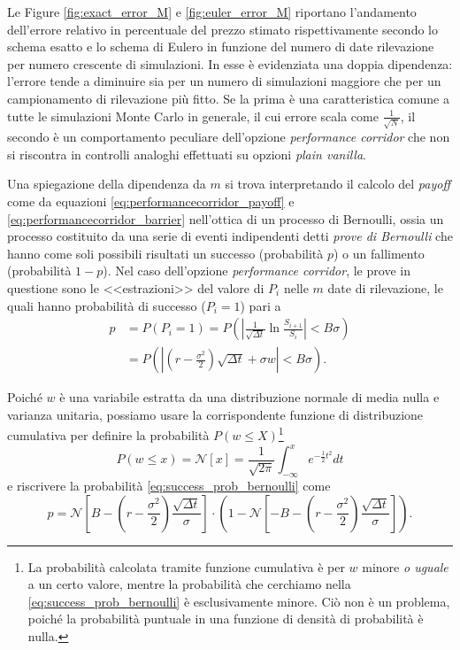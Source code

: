 Le Figure \ref{fig:exact_error_M} e \ref{fig:euler_error_M} riportano l'andamento dell'errore relativo in percentuale del prezzo stimato rispettivamente secondo lo schema esatto e lo schema di Eulero in funzione del numero di date rilevazione per numero crescente di simulazioni. In esse è evidenziata una doppia dipendenza: l'errore tende a diminuire sia per un numero di simulazioni maggiore che per un campionamento di rilevazione più fitto. Se la prima è una caratteristica comune a tutte le simulazioni Monte Carlo in generale, il cui errore scala come $\frac{1}{\sqrt{N}}$, il secondo è un comportamento peculiare dell'opzione \textit{performance corridor} che non si riscontra in controlli analoghi effettuati su opzioni \textit{plain vanilla}.

Una spiegazione della dipendenza da $m$ si trova interpretando il calcolo del \textit{payoff} come da equazioni \eqref{eq:performancecorridor_payoff} e \eqref{eq:performancecorridor_barrier} nell'ottica di un processo di Bernoulli, ossia un processo costituito da una serie di eventi indipendenti detti \textit{prove di Bernoulli} che hanno come soli possibili risultati un successo (probabilità $p$) o un fallimento (probabilità $1-p$). Nel caso dell'opzione \textit{performance corridor}, le prove in questione sono le <<estrazioni>> del valore di $P_i$ nelle $m$ date di rilevazione, le quali hanno probabilità di successo ($P_i=1$) pari a
\begin{equation}
\begin{aligned}
    p &= P(P_i = 1) = P\left(\left| \frac{1}{\sqrt{\Delta t}} \ln{\frac{S_{i+1}}{S_i}} \right| < B \sigma\right) \\
    &= P\left(\left| \left(r - \frac{\sigma^2}{2}\right)\sqrt{\Delta t} + \sigma w \right| < B \sigma\right).
    \label{eq:success_prob_bernoulli}
\end{aligned}
\end{equation}

Poiché $w$ è una variabile estratta da una distribuzione normale di media nulla e varianza unitaria, possiamo usare la corrispondente funzione di distribuzione cumulativa per definire la probabilità $P(w \leq X)$\footnote{La probabilità calcolata tramite funzione cumulativa è per $w$ minore \textit{o uguale} a un certo valore, mentre la probabilità che cerchiamo nella \eqref{eq:success_prob_bernoulli} è esclusivamente minore. Ciò non è un problema, poiché la probabilità puntuale in una funzione di densità di probabilità è nulla.}
\begin{equation}
    P(w \leq x) = \mathcal{N}[x] = \frac{1}{\sqrt{2\pi}} \int_{-\infty}^x{e^{-\frac{1}{2} t^2} dt}
    \label{eq:cumulative_gaussian}
\end{equation}
e riscrivere la probabilità \eqref{eq:success_prob_bernoulli} come
\begin{equation}
    p = \mathcal{N}\left[B - \left(r - \frac{\sigma^2}{2}\right)\frac{\sqrt{\Delta t}}{\sigma} \right] \cdot \left(1 - \mathcal{N}\left[- B - \left(r - \frac{\sigma^2}{2}\right)\frac{\sqrt{\Delta t}}{\sigma} \right]\right).
    \label{eq:success_prob_cumul}
\end{equation}

